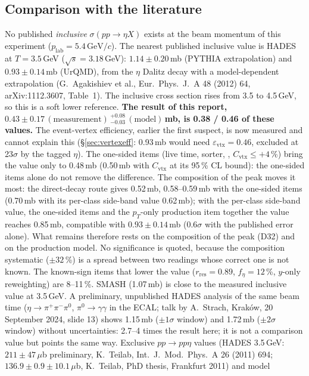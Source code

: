 \documentclass[11pt,a4paper]{article}
\newcommand{\piz}{\ensuremath{\pi^{0}}\xspace}
\newcommand{\pipi}{\ensuremath{\pi^{+}\pi^{-}}\xspace}
\newcommand{\GeVc}{\ensuremath{\mathrm{GeV}/c}\xspace}
\newcommand{\code}[1]{\texttt{\detokenize{#1}}}
\newcommand{\feta}{\ensuremath{f_\eta}\xspace}
\newcommand{\sigeta}{\ensuremath{\sigma(pp\to\eta X)}\xspace}
\begin{document}
\subsection{Comparison with the literature}
\label{sec:lit}
No published \emph{inclusive} \sigeta exists at the beam momentum of this experiment ($p_{\mathrm{lab}}=5.4$\,\GeVc). The nearest published
inclusive value is HADES at $T=3.5$\,GeV ($\sqrt{s}=3.18$\,GeV): $1.14\pm0.20$\,mb (PYTHIA extrapolation) and $0.93\pm0.14$\,mb (UrQMD), from the
$\eta$ Dalitz decay with a model-dependent extrapolation (G.~Agakishiev et al., Eur.\ Phys.\ J.\ A 48 (2012) 64, arXiv:1112.3607, Table~1).
The inclusive cross section rises from 3.5 to 4.5\,GeV, so this is a soft lower reference. \textbf{The result of this report, $0.43\pm0.17\,(\mathrm{measurement})\,^{+0.08}_{-0.03}\,(\mathrm{model})$\,mb,
is 0.38 / 0.46 of these values.} The event-vertex efficiency, earlier the first suspect, is now measured and cannot explain this
(\S\ref{sec:vertexeff}: 0.93\,mb would need $\varepsilon_{\mathrm{vtx}}=0.46$, excluded at 23$\sigma$ by the tagged $\eta$). The one-sided items
(live time, sorter, \code{cor_ok}, $C_{\mathrm{vtx}}\le+4$\,\%) bring the value only to 0.48\,mb (0.50\,mb with $C_{\mathrm{vtx}}$ at its 95\,\% CL
bound): the one-sided items alone do not remove the difference. The composition of the peak moves it most: the direct-decay route gives 0.52\,mb,
0.58--0.59\,mb with the one-sided items (0.70\,mb with its per-class side-band value 0.62\,mb); with the per-class side-band value, the one-sided
items and the $p_T$-only production item together the value reaches 0.85\,mb, compatible with $0.93\pm0.14$\,mb (0.6$\sigma$ with the published
error alone). What remains therefore rests on the composition of the peak (D32) and on the production model. No significance is quoted, because
the composition systematic ($\pm32$\,\%) is a spread between two readings whose correct one is not known. The known-sign items that lower the value
($r_{\mathrm{res}}=0.89$, $\feta=12$\,\%, $y$-only reweighting) are 8--11\,\%.
SMASH (1.07\,mb) is close to the measured inclusive value at 3.5\,GeV. A preliminary, unpublished HADES analysis of the same beam time ($\eta\to\pipi\piz$, $\piz\to\gamma\gamma$ in the ECAL; talk by A.~Strach,
Krak\'ow, 20 September 2024, slide 13) shows 1.15\,mb ($\pm1\sigma$ window) and 1.72\,mb ($\pm2\sigma$ window) without uncertainties: 2.7--4 times
the result here; it is not a comparison value but points the same way. Exclusive $pp\to pp\eta$ values (HADES 3.5\,GeV: $211\pm47$\,$\mu$b
preliminary, K.~Teilab, Int.\ J.\ Mod.\ Phys.\ A 26 (2011) 694; $136.9\pm0.9\pm10.1$\,$\mu$b, K.~Teilab, PhD thesis, Frankfurt 2011) and model
\end{document}
